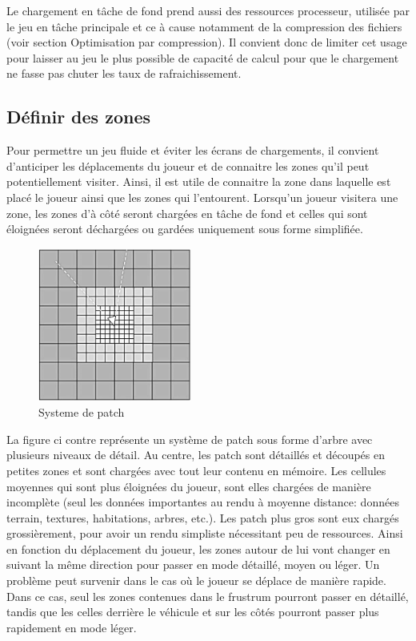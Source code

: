 \documentclass[a4paper, 11pt]{article} %
\begin{document}
Le chargement en tâche de fond prend aussi des ressources processeur, utilisée par le jeu en tâche principale et ce à cause notamment de la compression des fichiers (voir section Optimisation par compression). Il convient donc de limiter cet usage pour laisser au jeu le plus possible de capacité de calcul pour que le chargement ne fasse pas chuter les taux de rafraichissement.

\newpage
\subsection*{Définir des zones}
Pour permettre un jeu fluide et éviter les écrans de chargements, il convient d'anticiper les déplacements du joueur et de connaitre les zones qu'il peut potentiellement visiter. Ainsi, il est utile de connaitre la zone dans laquelle est placé le joueur ainsi que les zones qui l'entourent. Lorsqu'un joueur visitera une zone, les zones d'à côté seront chargées en tâche de fond et celles qui sont éloignées seront déchargées ou gardées uniquement sous forme simplifiée.

\begin{figure}
\begin{center}
\includegraphics[width=0.45\textwidth]{images/patch-system-three.png}
\end{center}
\caption{Systeme de patch}
\end{figure}

La figure ci contre représente un système de patch sous forme d'arbre avec plusieurs niveaux de détail. Au centre, les patch sont détaillés et découpés en petites zones et sont chargées avec tout leur contenu en mémoire. Les cellules moyennes qui sont plus éloignées du joueur, sont elles chargées de manière incomplète (seul les données importantes au rendu à moyenne distance: données terrain, textures, habitations, arbres, etc.). Les patch plus gros sont eux chargés grossièrement, pour avoir un rendu simpliste nécessitant peu de ressources. Ainsi en fonction du déplacement du joueur, les zones autour de lui vont changer en suivant la même direction pour passer en mode détaillé, moyen ou léger. Un problème peut survenir dans le cas où le joueur se déplace de manière rapide. Dans ce cas, seul les zones contenues dans le frustrum pourront passer en détaillé, tandis que les celles derrière le véhicule et sur les côtés pourront passer plus rapidement en mode léger.
\end{document}
